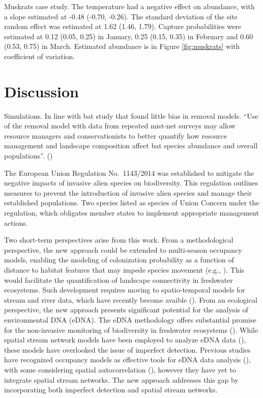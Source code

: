 \documentclass[
  11pt,
  a4paper,
]{article}
\begin{document}
Muskrats case study. The temperature had a negative effect on abundance, with a slope estimated at -0.48 (-0.70, -0.26). The standard deviation of the site random effect was estimated at 1.62 (1.46, 1.79). Capture probabilities were estimated at 0.12 (0.05, 0.25) in January, 0.25 (0.15, 0.35) in February and 0.60 (0.53, 0.75) in March. Estimated abundance is in Figure \ref{fig:muskrats} with coefficient of variation.

\section{Discussion}\label{discussion}

Simulations. In line with bat study that found little bias in removal models. ``Use of the removal model with data from repeated mist-net surveys may allow resource managers and conservationists to better quantify how resource management and landscape composition affect bat species abundance and overall populations''. ()

The European Union Regulation No.~1143/2014 was established to mitigate the negative impacts of invasive alien species on biodiversity. This regulation outlines measures to prevent the introduction of invasive alien species and manage their established populations. Two species listed as species of Union Concern under the regulation, which obligates member states to implement appropriate management actions.

Two short-term perspectives arise from this work. From a methodological perspective, the new approach could be extended to multi-season occupancy models, enabling the modeling of colonization probability as a function of distance to habitat features that may impede species movement (e.g., ). This would facilitate the quantification of landscape connectivity in freshwater ecosystems. Such development requires moving to spatio-temporal models for stream and river data, which have recently become avaible (). From an ecological perspective, the new approach presents significant potential for the analysis of environmental DNA (eDNA). The eDNA methodology offers substantial promise for the non-invasive monitoring of biodiversity in freshwater ecosystems (). While spatial stream network models have been employed to analyze eDNA data (), these models have overlooked the issue of imperfect detection. Previous studies have recognized occupancy models as effective tools for eDNA data analysis (), with some considering spatial autocorrelation (), however they have yet to integrate spatial stream networks. The new approach addresses this gap by incorporating both imperfect detection and spatial stream networks.
\end{document}
